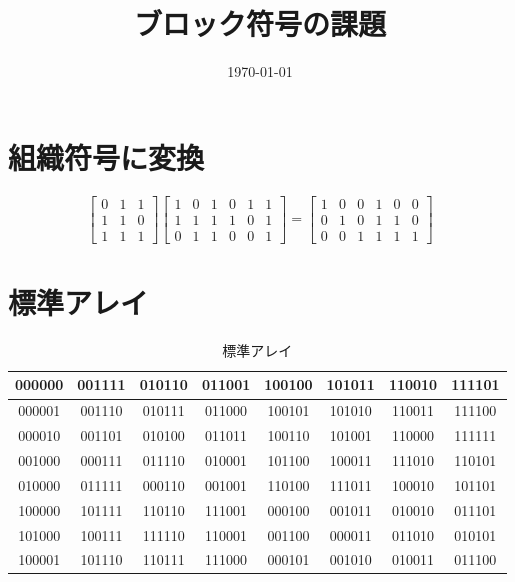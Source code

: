 \documentclass[a4paper,11pt]{jsarticle}
\begin{document}
\title{ブロック符号の課題}
\author{}
\date{\today}
\maketitle

\section{組織符号に変換}
\begin{equation*}
  \begin{bmatrix}
    0 & 1 & 1 \\
    1 & 1 & 0 \\
    1 & 1 & 1
  \end{bmatrix}
  \begin{bmatrix}
    1 & 0 & 1 & 0 & 1 & 1 \\
    1 & 1 & 1 & 1 & 0 & 1 \\
    0 & 1 & 1 & 0 & 0 & 1
  \end{bmatrix}=
  \begin{bmatrix}
    1 & 0 & 0 & 1 & 0 & 0 \\
    0 & 1 & 0 & 1 & 1 & 0 \\
    0 & 0 & 1 & 1 & 1 & 1
  \end{bmatrix}
\end{equation*}

\section{標準アレイ}
\begin{table}[hbtp]
  \caption{標準アレイ}
  \label{table:data_type}
  \centering
  \begin{tabular}{c|ccccccc}
    000000 & 001111 &	010110 & 011001	& 100100 & 101011 &	110010 & 111101 \\
    \hline
    000001 & 001110 &	010111 & 011000 &	100101 & 101010	& 110011 & 111100 \\
    000010 & 001101	& 010100 & 011011	& 100110 & 101001 & 110000 & 111111 \\
    001000 & 000111	& 011110 & 010001	& 101100 & 100011	& 111010 & 110101 \\
    010000 & 011111	& 000110 & 001001	& 110100 & 111011 & 100010 & 101101 \\
    100000 & 101111	& 110110 & 111001	& 000100 & 001011	& 010010 & 011101 \\
    101000 & 100111 & 111110 & 110001 & 001100 & 000011 & 011010 & 010101 \\
    100001 & 101110	& 110111 & 111000	& 000101 & 001010	& 010011 & 011100
  \end{tabular}
\end{table}
\end{document}
